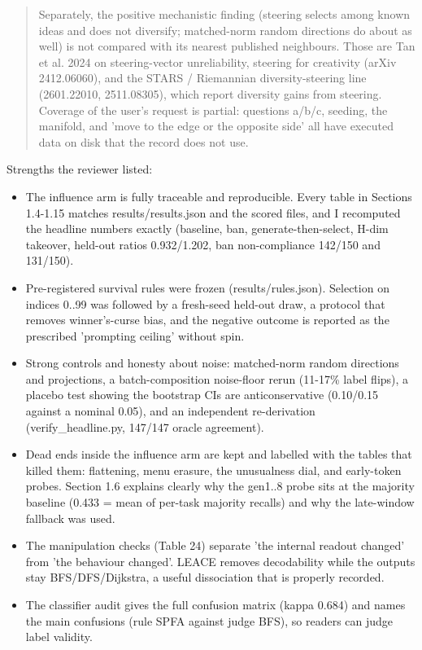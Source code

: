 \documentclass[11pt,letterpaper]{article}
\begin{document}
\begin{quote}
Separately, the positive mechanistic finding (steering selects among known ideas and does not diversify; matched-norm random directions do about as well) is not compared with its nearest published neighbours. Those are Tan et al. 2024 on steering-vector unreliability, steering for creativity (arXiv 2412.06060), and the STARS / Riemannian diversity-steering line (2601.22010, 2511.08305), which report diversity gains from steering. Coverage of the user's request is partial: questions a/b/c, seeding, the manifold, and 'move to the edge or the opposite side' all have executed data on disk that the record does not use.

\end{quote}

Strengths the reviewer listed:

\begin{itemize}\small

\item The influence arm is fully traceable and reproducible. Every table in Sections 1.4-1.15 matches results/results.json and the scored files, and I recomputed the headline numbers exactly (baseline, ban, generate-then-select, H-dim takeover, held-out ratios 0.932/1.202, ban non-compliance 142/150 and 131/150).

\item Pre-registered survival rules were frozen (results/rules.json). Selection on indices 0..99 was followed by a fresh-seed held-out draw, a protocol that removes winner's-curse bias, and the negative outcome is reported as the prescribed 'prompting ceiling' without spin.

\item Strong controls and honesty about noise: matched-norm random directions and projections, a batch-composition noise-floor rerun (11-17\% label flips), a placebo test showing the bootstrap CIs are anticonservative (0.10/0.15 against a nominal 0.05), and an independent re-derivation (verify\_headline.py, 147/147 oracle agreement).

\item Dead ends inside the influence arm are kept and labelled with the tables that killed them: flattening, menu erasure, the unusualness dial, and early-token probes. Section 1.6 explains clearly why the gen1..8 probe sits at the majority baseline (0.433 = mean of per-task majority recalls) and why the late-window fallback was used.

\item The manipulation checks (Table 24) separate 'the internal readout changed' from 'the behaviour changed'. LEACE removes decodability while the outputs stay BFS/DFS/Dijkstra, a useful dissociation that is properly recorded.

\item The classifier audit gives the full confusion matrix (kappa 0.684) and names the main confusions (rule SPFA against judge BFS), so readers can judge label validity.

\end{itemize}
\end{document}

